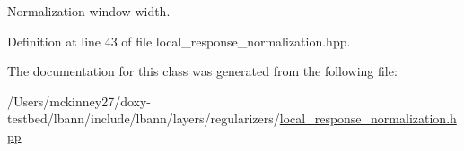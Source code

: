 Normalization window width. 



Definition at line 43 of file local\+\_\+response\+\_\+normalization.\+hpp.



The documentation for this class was generated from the following file\+:\begin{DoxyCompactItemize}
\item 
/\+Users/mckinney27/doxy-\/testbed/lbann/include/lbann/layers/regularizers/\hyperlink{local__response__normalization_8hpp}{local\+\_\+response\+\_\+normalization.\+hpp}\end{DoxyCompactItemize}
